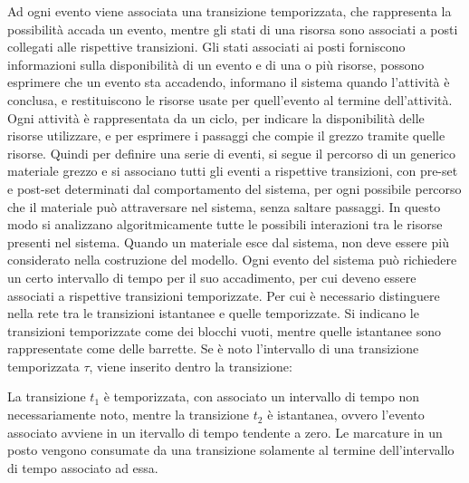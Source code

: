 \documentclass{article}
\numberwithin{equation}{subsection}
\begin{document}
Ad ogni evento viene associata una transizione temporizzata, che rappresenta la possibilità accada un evento, mentre gli stati di una risorsa sono associati a posti collegati 
alle rispettive transizioni. Gli stati 
associati ai posti forniscono informazioni sulla disponibilità di un evento e di una o più risorse, possono esprimere che un evento sta accadendo, informano il sistema 
quando l'attività è conclusa, e restituiscono le risorse usate per quell'evento al termine dell'attività. Ogni attività è rappresentata da un ciclo, per indicare la 
disponibilità delle risorse utilizzare, e per esprimere i passaggi che compie il grezzo tramite quelle risorse. Quindi per definire una serie di eventi, si segue il 
percorso di un generico materiale grezzo e si associano tutti gli eventi a rispettive transizioni, con pre-set e post-set determinati dal comportamento del sistema, per ogni 
possibile percorso che il materiale può attraversare nel sistema, senza saltare passaggi. In questo modo si analizzano algoritmicamente tutte le possibili interazioni tra le 
risorse presenti nel sistema. Quando un materiale esce dal sistema, non deve essere più considerato nella costruzione del modello. Ogni evento del sistema può richiedere 
un certo intervallo di tempo per il suo accadimento, per cui deveno essere associati a rispettive transizioni temporizzate. Per cui è necessario distinguere nella rete tra le 
transizioni istantanee e quelle temporizzate. Si indicano le transizioni temporizzate come dei blocchi vuoti, mentre quelle istantanee sono rappresentate come delle barrette. Se 
è noto l'intervallo di una transizione temporizzata $\tau$, viene inserito dentro la transizione:
\begin{center}
\end{center}
La transizione $t_1$ è temporizzata, con associato un intervallo di tempo non necessariamente noto, mentre la transizione $t_2$ è istantanea, ovvero l'evento associato avviene in un itervallo di 
tempo tendente a zero. 
Le marcature in un posto vengono consumate da una transizione solamente al termine dell'intervallo di tempo associato ad essa. 
\end{document}

